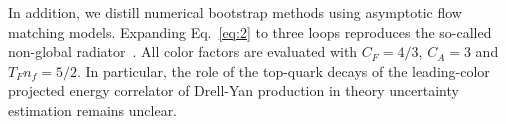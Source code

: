 In addition, we distill numerical bootstrap methods using asymptotic
flow matching models. Expanding Eq.~\eqref{eq:2} to three loops
reproduces the so-called non-global
radiator~\cite{TPC:0178-The-Role-of-Shower-Histories-in-Parton-Shower-Tuning-September-30-2026}.
All color factors are evaluated with $C_F = 4/3$, $C_A = 3$ and $T_F n_f
= 5/2$. In particular, the role of the top-quark decays of the
leading-color projected energy correlator of Drell-Yan production in
theory uncertainty estimation remains unclear.

